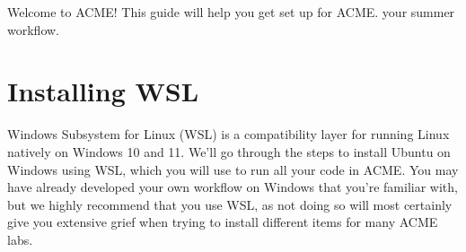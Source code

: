 \ifwindows
{}
\else
{}
\fi


Welcome to ACME!
This guide will help you get set up for
\ifbootcamp
ACME.
\else
your summer workflow.
\fi


\ifwindows
\section*{Installing WSL}

Windows Subsystem for Linux (WSL) is a compatibility layer for running Linux natively on Windows 10 and 11. 
We'll go through the steps to install Ubuntu on Windows using WSL, which you will use to run all your code in ACME.
You may have already developed your own workflow on Windows that you're familiar with, but we highly recommend that you use WSL, as not doing so will most certainly give you extensive grief when trying to install different items for many ACME labs.

